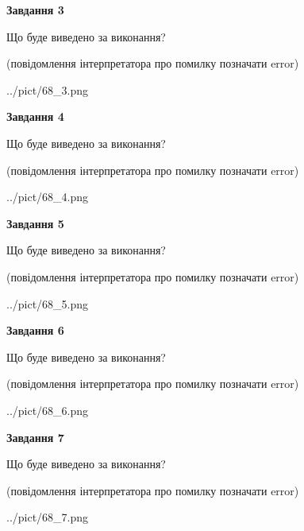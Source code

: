 \documentclass[12pt, ukrainian]{article}
\begin{document}
{\begin {large}
{\begin {center}\textbf{Завдання 3}\end {center}}\par
Що буде виведено за виконання?\par
 (повідомлення інтерпретатора про помилку позначати error)\par
\begin{center}
	{../pict/68_3.png}
\end{center}
\newpage

{\begin {center}\textbf{Завдання 4}\end {center}}\par
Що буде виведено за виконання?\par
 (повідомлення інтерпретатора про помилку позначати error)\par
\begin{center}
	{../pict/68_4.png}
\end{center}
\newpage

{\begin {center}\textbf{Завдання 5}\end {center}}\par
Що буде виведено за виконання?\par
 (повідомлення інтерпретатора про помилку позначати error)\par
\begin{center}
	{../pict/68_5.png}
\end{center}
\newpage

{\begin {center}\textbf{Завдання 6}\end {center}}\par
Що буде виведено за виконання?\par
 (повідомлення інтерпретатора про помилку позначати error)\par
\begin{center}
	{../pict/68_6.png}
\end{center}
\newpage

{\begin {center}\textbf{Завдання 7}\end {center}}\par
Що буде виведено за виконання?\par
 (повідомлення інтерпретатора про помилку позначати error)\par
\begin{center}
	{../pict/68_7.png}
\end{center}
\newpage


\end{large}}
\end{document}

